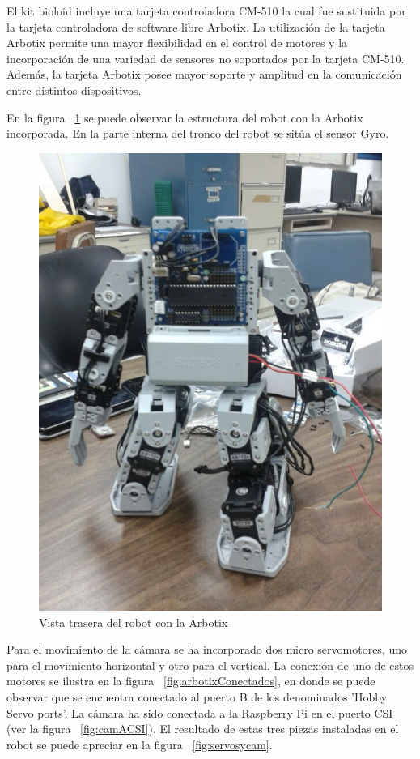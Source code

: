 El kit bioloid incluye una tarjeta controladora CM-510 la cual fue sustituida por la tarjeta controladora de software libre Arbotix. La utilización de la tarjeta Arbotix permite una mayor flexibilidad en el control de motores y la incorporación de una variedad de sensores no soportados por la tarjeta CM-510.
Además, la tarjeta Arbotix posee mayor soporte y amplitud en la comunicación entre distintos dispositivos. 

En la figura ~\ref{fig:trasera2} se puede observar la estructura del robot con la Arbotix incorporada. En la parte interna del tronco del robot se sitúa el sensor Gyro.

\begin{figure}[hbtp]
\centering
\includegraphics[scale=0.2]{imagenes/traseroDeJunny.jpg}
\caption{Vista trasera del robot con la Arbotix}
\label{fig:trasera2}
\end{figure}



Para el movimiento de la cámara se ha incorporado dos micro servomotores, uno para el movimiento horizontal y otro para el vertical. La conexión de uno de estos motores se ilustra en la figura ~\ref{fig:arbotixConectados}, en donde se puede observar que se encuentra conectado al puerto B de los denominados 'Hobby Servo ports'. La cámara ha sido conectada a la Raspberry Pi en el puerto CSI (ver la figura ~\ref{fig:camACSI}). El resultado de estas tres piezas instaladas en el robot se puede apreciar en la figura ~\ref{fig:servosycam}.

